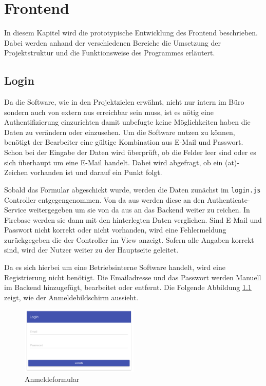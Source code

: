 \chapter{Frontend}
In diesem Kapitel wird die prototypische Entwicklung des Frontend beschrieben. Dabei werden anhand der verschiedenen Bereiche die Umsetzung der Projektstruktur und die Funktionsweise des Programmes erläutert.

\section{Login}
Da die Software, wie in den Projektzielen erwähnt, nicht nur intern im Büro sondern auch von extern aus erreichbar sein muss, ist es nötig eine Authentifizierung einzurichten damit unbefugte keine Möglichkeiten haben die Daten zu verändern oder einzusehen. Um die Software nutzen zu können, benötigt der Bearbeiter eine gültige Kombination aus E-Mail und Passwort. Schon bei der Eingabe der Daten wird überprüft, ob die Felder leer sind oder es sich überhaupt um eine E-Mail handelt. Dabei wird abgefragt, ob ein (at)-Zeichen vorhanden ist und darauf ein Punkt folgt.

Sobald das Formular abgeschickt wurde, werden die Daten zunächst im \texttt{login.js} Controller entgegengenommen. Von da aus werden diese an den Authenticate-Service weitergegeben um sie von da aus an das Backend weiter zu reichen. In Firebase werden sie dann mit den hinterlegten Daten verglichen. Sind E-Mail und Passwort nicht korrekt oder nicht vorhanden, wird eine Fehlermeldung zurückgegeben die der Controller im View anzeigt. Sofern alle Angaben korrekt sind, wird der Nutzer weiter zu der Hauptseite geleitet. 

Da es sich hierbei um eine Betriebsinterne Software handelt, wird eine Registrierung nicht benötigt. Die Emailadresse und das Passwort werden Manuell im Backend hinzugefügt, bearbeitet oder entfernt. 
Die Folgende Abbildung \ref{frontend_login} zeigt, wie der Anmeldebildschirm aussieht. 

\begin{figure}[H]
\centering\includegraphics[width=0.5\textwidth]{images/frontend_login.png}
\caption{Anmeldeformular}
\label{frontend_login}
\end{figure}

